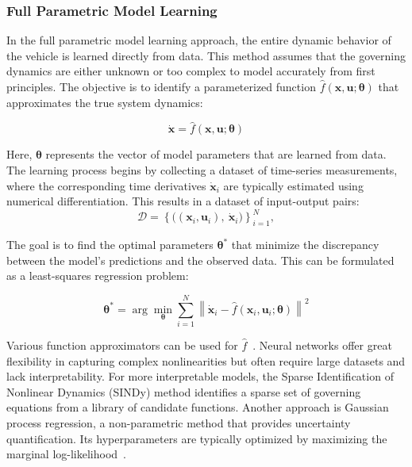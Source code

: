\subsubsection{Full Parametric Model Learning}

In the full parametric model learning approach, the entire dynamic behavior of the vehicle is learned directly from data. This method assumes that the governing dynamics are either unknown or too complex to model accurately from first principles. The objective is to identify a parameterized function $\hat{f}(\boldsymbol{x}, \mathbf{u}; \boldsymbol{\theta})$ that approximates the true system dynamics:

\begin{equation}
    \dot{\boldsymbol{x}} = \hat{f}(\boldsymbol{x}, \mathbf{u}; \boldsymbol{\theta})
\end{equation}

Here, $\boldsymbol{\theta}$ represents the vector of model parameters that are learned from data. The learning process begins by collecting a dataset of time-series measurements, where the corresponding time derivatives $\dot{\boldsymbol{x}}_i$ are typically estimated using numerical differentiation. This results in a dataset of input-output pairs:
\[
\mathcal{D} = \left\{ \big((\boldsymbol{x}_i, \mathbf{u}_i),\ \dot{\boldsymbol{x}}_i \big) \right\}_{i=1}^N,
\]



The goal is to find the optimal parameters $\boldsymbol{\theta}^*$ that minimize the discrepancy between the model's predictions and the observed data. This can be formulated as a least-squares regression problem:

\begin{equation}
    \boldsymbol{\theta}^* = \arg \min_{\boldsymbol{\theta}} \sum_{i=1}^N \left\| \dot{\boldsymbol{x}}_i - \hat{f}(\boldsymbol{x}_i, \mathbf{u}_i; \boldsymbol{\theta}) \right\|^2
\end{equation}

Various function approximators can be used for $\hat{f}$~\cite{brunton2025machine}. Neural networks offer great flexibility in capturing complex nonlinearities but often require large datasets and lack interpretability. For more interpretable models, the Sparse Identification of Nonlinear Dynamics (SINDy) method identifies a sparse set of governing equations from a library of candidate functions. Another approach is Gaussian process regression, a non-parametric method that provides uncertainty quantification. Its hyperparameters are typically optimized by maximizing the marginal log-likelihood~\cite{rasmussen_gaussian_2008}.

